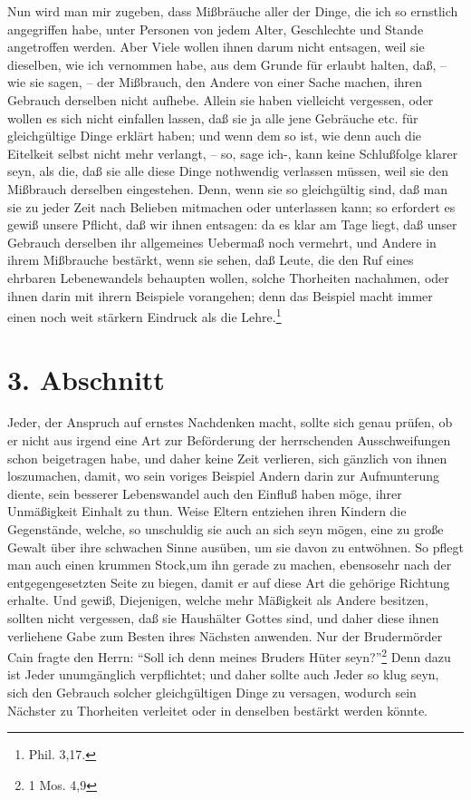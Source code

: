 Nun wird man mir zugeben, dass Mißbräuche aller der Dinge, die ich so ernstlich
angegriffen habe, unter Personen von jedem Alter, Geschlechte und Stande
angetroffen werden. Aber Viele wollen ihnen darum nicht entsagen, weil sie
dieselben, wie ich vernommen habe, aus dem Grunde für erlaubt halten, daß, --
wie sie sagen, -- der Mißbrauch, den Andere von einer Sache  machen, ihren
Gebrauch derselben nicht aufhebe. Allein sie haben vielleicht vergessen, oder
wollen es sich nicht einfallen lassen, daß sie ja alle jene Gebräuche etc. für
gleichgültige Dinge erklärt haben; und wenn dem so ist, wie denn auch die
Eitelkeit selbst nicht mehr verlangt, -- so, sage ich-, kann keine Schlußfolge
klarer seyn, als die, daß sie alle diese Dinge nothwendig verlassen müssen, weil
sie den Mißbrauch derselben eingestehen. Denn, wenn sie so gleichgültig sind,
daß man sie zu jeder Zeit nach Belieben mitmachen oder unterlassen kann; so
erfordert es gewiß unsere Pflicht, daß wir ihnen entsagen: da es klar am Tage
liegt, daß unser Gebrauch derselben ihr allgemeines Uebermaß noch vermehrt, und
Andere in ihrem Mißbrauche bestärkt, wenn sie sehen, daß Leute, die den Ruf
eines ehrbaren Lebenewandels behaupten wollen, solche Thorheiten nachahmen, oder
ihnen darin mit ihrern Beispiele vorangehen; denn das Beispiel macht immer einen
noch weit stärkern Eindruck als die Lehre.\footnote{Phil. 3,17.}

\section{3. Abschnitt} \label{kap18_ab3}

Jeder, der Anspruch auf ernstes Nachdenken macht, sollte sich genau prüfen, ob
er nicht aus irgend eine Art zur Beförderung der herrschenden Ausschweifungen
schon beigetragen habe, und daher keine Zeit verlieren, sich gänzlich von ihnen
loszumachen, damit, wo sein voriges Beispiel Andern darin zur Aufmunterung
diente, sein besserer Lebenswandel auch den Einfluß haben möge, ihrer
Unmäßigkeit Einhalt zu thun. Weise Eltern entziehen ihren Kindern die
Gegenstände, welche, so unschuldig sie auch an sich seyn mögen, eine zu große
Gewalt über ihre schwachen Sinne ausüben, um sie davon zu entwöhnen. So pflegt
man auch einen krummen Stock,um ihn gerade zu machen, ebensosehr nach der
entgegengesetzten Seite zu biegen, damit er auf diese Art die gehörige Richtung
erhalte. Und gewiß, Diejenigen, welche mehr Mäßigkeit als Andere besitzen,
sollten nicht vergessen, daß sie Haushälter Gottes sind, und daher diese ihnen
verliehene Gabe zum Besten ihres Nächsten anwenden. Nur der Brudermörder Cain
fragte den Herrn: "`Soll ich denn meines Bruders Hüter seyn?"'\footnote{1 Mos.
4,9} Denn dazu ist Jeder unumgänglich verpflichtet; und daher sollte auch Jeder
so klug seyn, sich den Gebrauch solcher gleichgültigen Dinge zu versagen,
wodurch sein Nächster zu Thorheiten verleitet oder in denselben bestärkt werden
könnte.


